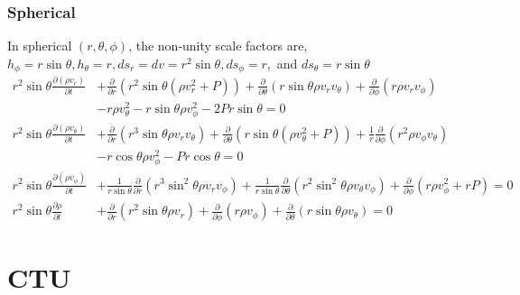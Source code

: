 \documentclass{article}
\newcommand{\pderiv}[1]{\frac{\partial }{\partial #1}}
\newcommand{\ppderiv}[2]{\frac{\partial #1}{\partial #2}}
\begin{document}
\subsubsection{Spherical}
In spherical $(r,\theta,\phi)$, the non-unity scale factors are, $h_\phi =r \sin \theta, h_\theta = r, ds_r =dv= r^2 \sin \theta, ds_\phi = r,$ and $ds_\theta = r \sin\theta$
\begin{align}
r^2 \sin \theta \ppderiv{(\rho v_r)}{t} &+ \pderiv{r} \left( r^2 \sin \theta (\rho v_r^2 + P) \right) + \pderiv{\theta} \left( r \sin \theta \rho v_r v_\theta \right) + \pderiv{\phi} \left( r \rho v_r v_\phi \right) \nonumber \\
&- r \rho v_\theta^2 - r \sin \theta \rho v_\phi^2  - 2 P r \sin \theta = 0 \\
r^2 \sin \theta \ppderiv{(\rho v_\theta)}{t} &+ \pderiv{r} \left( r^3 \sin \theta \rho v_r v_\theta \right) + \pderiv{\theta} \left( r \sin \theta ( \rho v_\theta^2 + P) \right) + \frac{1}{r} \pderiv{\phi} \left( r^2 \rho v_\phi v_\theta \right) \nonumber \\ 
&- r \cos \theta \rho v_\phi^2 - P r \cos{\theta} = 0 \\
r^2 \sin \theta \ppderiv{(\rho v_\phi)}{t} &+ \frac{1}{r \sin \theta} \pderiv{r} \left( r^3 \sin^2 \theta \rho v_r v_\phi \right) + \frac{1}{r \sin \theta} \pderiv{\theta} \left( r^2 \sin^2 \theta \rho v_\theta v_\phi \right) + \pderiv{\phi} \left( r \rho v_\phi^2 + r P \right) = 0 \\
r^2 \sin \theta \ppderiv{\rho}{t} &+ \pderiv{r} \left( r^2 \sin \theta \rho v_r \right) + \pderiv{\phi} \left(r \rho v_\phi \right) + \pderiv{\theta} \left(r \sin \theta  \rho v_\theta \right)   = 0
\end{align}







\section{CTU}
\end{document}
